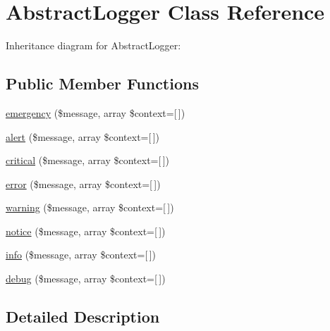 \hypertarget{class_zest_1_1_common_1_1_logger_1_1_abstract_logger}{}\section{Abstract\+Logger Class Reference}
\label{class_zest_1_1_common_1_1_logger_1_1_abstract_logger}


Inheritance diagram for Abstract\+Logger\+:
\subsection*{Public Member Functions}
\begin{DoxyCompactItemize}
\item 
\mbox{\hyperlink{class_zest_1_1_common_1_1_logger_1_1_abstract_logger_a8e44733d5c28a4d7799badda95cbca6f}{emergency}} (\$message, array \$context=\mbox{[}$\,$\mbox{]})
\item 
\mbox{\hyperlink{class_zest_1_1_common_1_1_logger_1_1_abstract_logger_ad1a92292e398409b7e44ab298fdad127}{alert}} (\$message, array \$context=\mbox{[}$\,$\mbox{]})
\item 
\mbox{\hyperlink{class_zest_1_1_common_1_1_logger_1_1_abstract_logger_ab5ebff9512b78e26c896f72ac5d544ff}{critical}} (\$message, array \$context=\mbox{[}$\,$\mbox{]})
\item 
\mbox{\hyperlink{class_zest_1_1_common_1_1_logger_1_1_abstract_logger_a7545997e30fe965d666f20bdcbcde118}{error}} (\$message, array \$context=\mbox{[}$\,$\mbox{]})
\item 
\mbox{\hyperlink{class_zest_1_1_common_1_1_logger_1_1_abstract_logger_ab0265cec309e8de8592c2efc3d00773a}{warning}} (\$message, array \$context=\mbox{[}$\,$\mbox{]})
\item 
\mbox{\hyperlink{class_zest_1_1_common_1_1_logger_1_1_abstract_logger_abe7cfefc7dacfe6e77c248d62552f824}{notice}} (\$message, array \$context=\mbox{[}$\,$\mbox{]})
\item 
\mbox{\hyperlink{class_zest_1_1_common_1_1_logger_1_1_abstract_logger_a965d1818b6b268d5b49dbf94ff7bc445}{info}} (\$message, array \$context=\mbox{[}$\,$\mbox{]})
\item 
\mbox{\hyperlink{class_zest_1_1_common_1_1_logger_1_1_abstract_logger_a30d64800fcc051abf015b61a4307958c}{debug}} (\$message, array \$context=\mbox{[}$\,$\mbox{]})
\end{DoxyCompactItemize}


\subsection{Detailed Description}


